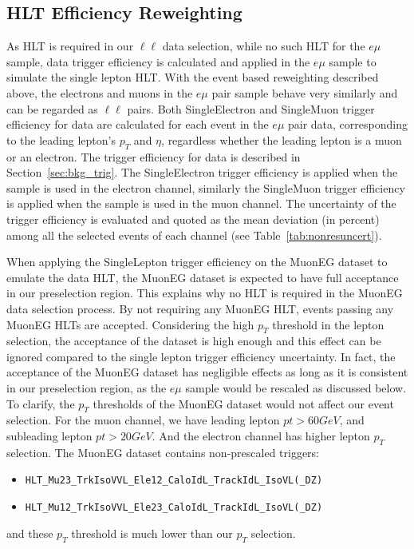 \subsection{HLT Efficiency Reweighting}
As HLT is required in our $\ell \ell$ data selection, while no such HLT for the $e\mu$ sample, data trigger efficiency is calculated and applied in the $e\mu$ sample to simulate the single lepton HLT. With the event based reweighting described above, the electrons and muons in the $e\mu$ pair sample behave very similarly and can be regarded as $\ell \ell$ pairs. Both SingleElectron and SingleMuon trigger efficiency for data are calculated for each event in the $e\mu$ pair data, corresponding to the leading lepton's $p_T$ and $\eta$, regardless whether the leading lepton is a muon or an electron. The trigger efficiency for data is described in Section~\ref{sec:bkg_trig}. The SingleElectron trigger efficiency is applied when the sample is used in the electron channel, similarly the SingleMuon trigger efficiency is applied when the sample is used in the muon channel. The uncertainty of the trigger efficiency is evaluated and quoted as the mean deviation (in percent) among all the selected events of each channel (see Table~\ref{tab:nonresuncert}).

\vspace{0.3cm}
When applying the SingleLepton trigger efficiency on the MuonEG dataset to emulate the data HLT, the MuonEG dataset is expected to have full acceptance in our preselection region. This explains why no HLT is required in the MuonEG data selection process. By not requiring any MuonEG HLT, events passing any MuonEG HLTs are accepted. Considering the high $p_T$ threshold in the lepton selection, the acceptance of the dataset is high enough and this effect can be ignored compared to the single lepton trigger efficiency uncertainty. In fact, the acceptance of the MuonEG dataset has negligible effects as long as it is consistent in our preselection region, as the $e\mu$ sample would be rescaled as discussed below. To clarify, the $p_T$ thresholds of the MuonEG dataset would not affect our event selection. For the muon channel, we have leading lepton $pt>60 GeV$, and subleading lepton $pt>20 GeV$. And the electron channel has higher lepton $p_T$ selection. The MuonEG dataset contains non-prescaled triggers:
\begin{itemize}
\item \texttt{HLT\_Mu23\_TrkIsoVVL\_Ele12\_CaloIdL\_TrackIdL\_IsoVL(\_DZ)} 
\item \texttt{HLT\_Mu12\_TrkIsoVVL\_Ele23\_CaloIdL\_TrackIdL\_IsoVL(\_DZ)}
\end{itemize}
and these $p_T$ threshold is much lower than our $p_T$ selection.

